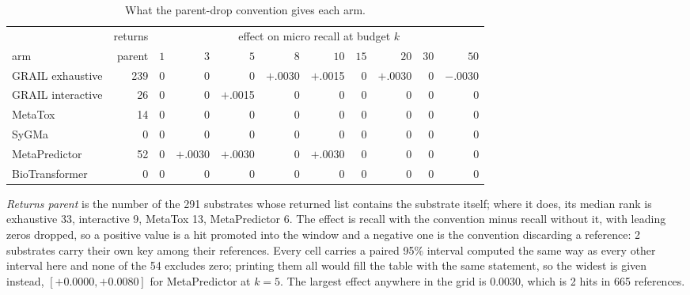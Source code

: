 \begin{table}[h]
\centering\scriptsize
\begin{threeparttable}
\caption{What the parent-drop convention gives each arm.}
\label{tab:si-parentdrop}
\begin{tabular}{lrrrrrrrrrr}
\toprule
 & returns & \multicolumn{9}{c}{effect on micro recall at budget $k$} \\
\cmidrule(lr){3-11}
arm & parent & $1$ & $3$ & $5$ & $8$ & $10$ & $15$ & $20$ & $30$ & $50$ \\
\midrule
GRAIL exhaustive & 239 & $0$ & $0$ & $0$ & $+$.0030 & $+$.0015 & $0$ & $+$.0030 & $0$ & $-$.0030 \\
GRAIL interactive & 26 & $0$ & $0$ & $+$.0015 & $0$ & $0$ & $0$ & $0$ & $0$ & $0$ \\
MetaTox & 14 & $0$ & $0$ & $0$ & $0$ & $0$ & $0$ & $0$ & $0$ & $0$ \\
SyGMa & 0 & $0$ & $0$ & $0$ & $0$ & $0$ & $0$ & $0$ & $0$ & $0$ \\
MetaPredictor & 52 & $0$ & $+$.0030 & $+$.0030 & $0$ & $+$.0030 & $0$ & $0$ & $0$ & $0$ \\
BioTransformer & 0 & $0$ & $0$ & $0$ & $0$ & $0$ & $0$ & $0$ & $0$ & $0$ \\
\bottomrule
\end{tabular}
\begin{tablenotes}[flushleft]\footnotesize
\item \emph{Returns parent} is the number of the 291 substrates whose returned list contains the substrate itself; where it does, its median rank is exhaustive 33, interactive 9, MetaTox 13, MetaPredictor 6. The effect is recall with the convention minus recall without it, with leading zeros dropped, so a positive value is a hit promoted into the window and a negative one is the convention discarding a reference: 2 substrates carry their own key among their references. Every cell carries a paired 95\% interval computed the same way as every other interval here and none of the 54 excludes zero; printing them all would fill the table with the same statement, so the widest is given instead, $[+0.0000, +0.0080]$ for MetaPredictor at $k=5$. The largest effect anywhere in the grid is 0.0030, which is 2 hits in 665 references.
\end{tablenotes}
\end{threeparttable}
\end{table}
